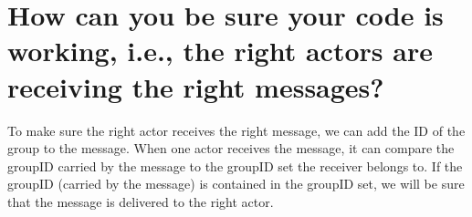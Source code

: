 \documentclass[twoside]{article}
\begin{document}
\section{How can you be sure your code is working, i.e., the right actors are receiving the right messages?}
To make sure the right actor receives the right message, we can add the ID of the group to the message. When one actor receives the message, it can compare the groupID carried by the message to the groupID set the receiver belongs to. If the groupID (carried by the message) is contained in the groupID set, we will be sure that the message is delivered to the right actor. 
\end{document}
